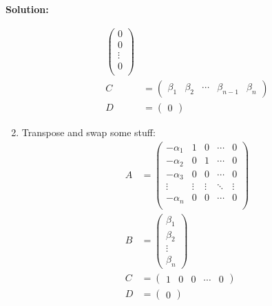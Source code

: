 \documentclass[12pt]{article}
\newenvironment{solution}{
    \textbf{Solution:}
    
}{
    
    \vspace{2em}
}
\begin{document}
\begin{solution}
\begin{enumerate}[label=(\alph*)]
\[\begin{aligned}
\begin{pmatrix}
                    0 \\
                    0 \\
                    \vdots \\
                    0 \\
                \end{pmatrix}\\
                C &= \begin{pmatrix}
                    \beta_1 & \beta_2 & \cdots & \beta_{n-1} & \beta_n
                \end{pmatrix}\\
                D &= \begin{pmatrix}
                    0
                \end{pmatrix}
            \end{aligned}
        \]
        \item Transpose and swap some stuff:
        \[
            \begin{aligned}
                A &= \begin{pmatrix}
                    -\alpha_1 & 1 & 0 & \cdots & 0 \\
                    -\alpha_2 & 0 & 1 & \cdots & 0 \\
                    -\alpha_3 & 0 & 0 & \cdots & 0 \\
                    \vdots & \vdots & \vdots & \ddots & \vdots \\
                    -\alpha_n & 0 & 0 & \cdots & 0 \\
                \end{pmatrix}\\
                B &= \begin{pmatrix}
                    \beta_1 \\
                    \beta_2 \\
                    \vdots \\
                    \beta_n
                \end{pmatrix}\\
                C &= \begin{pmatrix}
                    1 & 0 & 0 & \cdots & 0
                \end{pmatrix}\\
                D &= \begin{pmatrix}
                    0
                \end{pmatrix}
            \end{aligned}
        \]
    \end{enumerate}
\end{solution}
\end{document}
